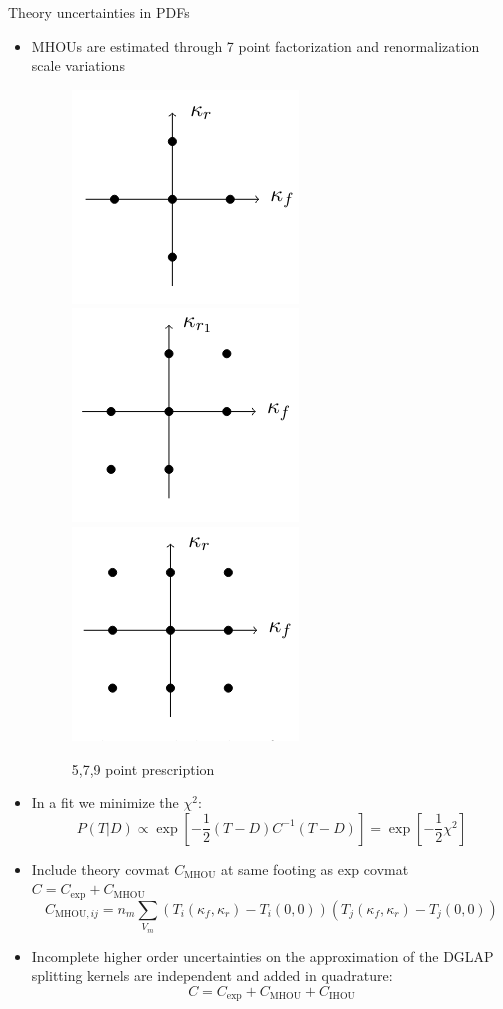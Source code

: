 \documentclass[8pt,t]{beamer}
\begin{document}
\begin{frame}{Theory uncertainties in PDFs}
  \vspace*{1em}
  \begin{itemize}
    \item MHOUs are estimated through 7 point factorization and renormalization scale variations \\
    \begin{figure}
      \includegraphics[width=.2\textwidth]{figures/5point.png}
      \includegraphics[width=.2\textwidth]{figures/7point.png}
      \includegraphics[width=.2\textwidth]{figures/9point.png}
      \caption*{5,7,9 point prescription}
    \end{figure}
    \item In a fit we minimize the $\chi^2$: \\
    $$P(T|D) \propto \exp\left[-\frac{1}{2}\left(T-D\right)C^{-1}\left(T-D\right)\right] = \exp\left[-\frac{1}{2}\chi^2\right]$$
    \item Include theory covmat $C_\mathrm{MHOU}$ at same footing as exp covmat $C = C_\mathrm{exp}+C_\mathrm{MHOU}$ \\
    $$C_{\mathrm{MHOU},ij} = n_{m}\sum_{V_{m}}\left(T_{i}(\kappa_f, \kappa_r) - T_{i}(0, 0)\right)\left(T_{j}(\kappa_f, \kappa_r) - T_{j}(0, 0)\right)$$
    \item Incomplete higher order uncertainties on the approximation of the DGLAP splitting kernels are independent and added in quadrature: \\
    $$C = C_\mathrm{exp}+C_\mathrm{MHOU} + C_\mathrm{IHOU} $$
  \end{itemize}

  \vspace*{1em}

\end{frame}
\end{document}
